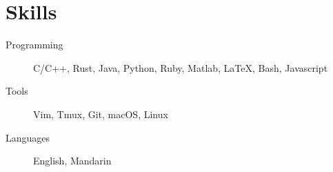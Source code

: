 \section{Skills}

\begin{description}
 \item[Programming] C/C++, Rust, Java, Python, Ruby, Matlab, \LaTeX, Bash, Javascript
 \item[Tools] Vim, Tmux, Git, macOS, Linux
 \item[Languages] English, Mandarin
\end{description}